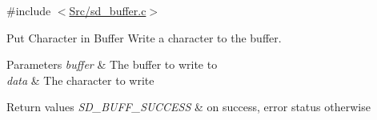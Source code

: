 {\ttfamily \#include $<$\mbox{\hyperlink{sd__buffer_8c}{Src/sd\+\_\+buffer.\+c}}$>$}



Put Character in Buffer Write a character to the buffer. 


\begin{DoxyParams}{Parameters}
{\em buffer} & The buffer to write to \\
\hline
{\em data} & The character to write \\
\hline
\end{DoxyParams}

\begin{DoxyRetVals}{Return values}
{\em S\+D\+\_\+\+B\+U\+F\+F\+\_\+\+S\+U\+C\+C\+E\+SS} & on success, error status otherwise \\
\hline
\end{DoxyRetVals}

